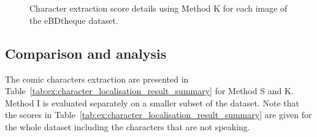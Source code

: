 \begin{figure}[h]
 \centering
  \\
  \\
 \caption{Character extraction score details using Method K for each image of the eBDtheque dataset.
 }
 \label{fig:ex:character_methodC_extraction_detail}
\end{figure}



\subsection{Comparison and analysis} %
\label{sub:result_analysis}


The comic characters extraction are presented in Table~\ref{tab:ex:character_localisation_result_summary} for Method S and K.
Method I is evaluated separately on a smaller subset of the dataset.
Note that the scores in Table~\ref{tab:ex:character_localisation_result_summary} are given for the whole dataset including the characters that are not speaking.


